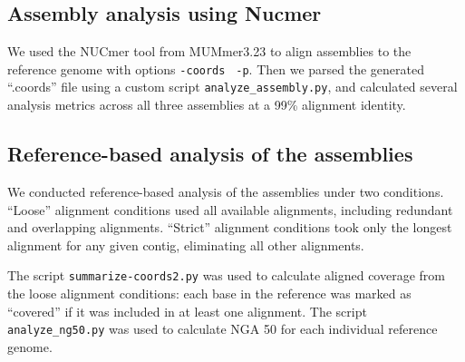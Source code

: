 \documentclass[11pt]{article}
\begin{document}




\subsection*{Assembly analysis using Nucmer}

We used the NUCmer tool from MUMmer3.23 \cite{mummer3.0} to align
assemblies to the reference genome with options {\tt \--coords} {\tt
  -p}. Then we parsed the generated ``.coords'' file using a custom
script {\tt{analyze\_assembly.py}}, and calculated several analysis
metrics across all three assemblies at a 99\% alignment identity.

\subsection*{Reference-based analysis of the assemblies}

We conducted reference-based analysis of the assemblies under two
conditions.  ``Loose'' alignment conditions used all available
alignments, including redundant and overlapping alignments. ``Strict''
alignment conditions took only the longest alignment for any given
contig, eliminating all other alignments.

The script {\tt summarize-coords2.py} was used to calculate aligned
coverage from the loose alignment conditions: each base in the reference
was marked as ``covered'' if it was included in at least one alignment.
The script {\tt analyze\_ng50.py} was used to calculate NGA 50 for
each individual reference genome.
\end{document}
